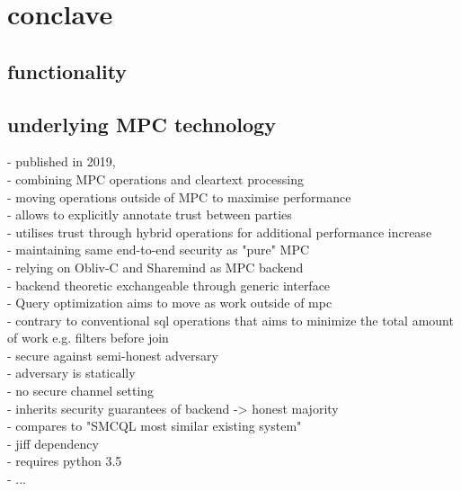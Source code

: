 \section{conclave}


\subsection{functionality}

\subsection{underlying MPC technology}


- published in 2019,\\
- combining MPC operations and cleartext processing\\ 
- moving operations outside of MPC to maximise performance\\
- allows to explicitly annotate trust between parties\\
- utilises trust through hybrid operations for additional performance increase \\
- maintaining same end-to-end security as "pure" MPC     \\
- relying on Obliv-C and Sharemind as MPC backend\\
- backend theoretic exchangeable through generic interface\\

- Query optimization aims to move as work outside of mpc\\
- contrary to conventional sql operations that aims to minimize the total amount of work e.g. filters before join \\

- secure against semi-honest adversary \\
- adversary is statically\\
- no secure channel setting\\
- inherits security guarantees of backend -> honest majority \\
- compares to "SMCQL most similar existing system"\\
- jiff dependency \\
- requires python 3.5 \\
- ...
